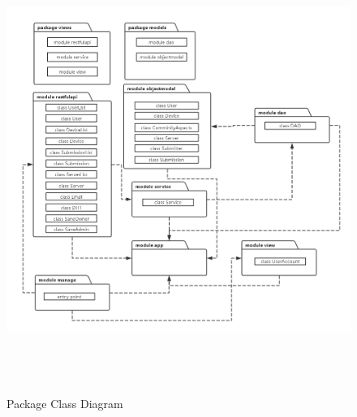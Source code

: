 \documentclass[12pt,oneside,a4paper]{article}
\begin{document}
\begin{figure}[htb]
\centering
\includegraphics[width=450px, height=550px]{classdiagram.png}
\caption{Package Class Diagram}
\label{picture-label14}
\end{figure}\\
\clearpage
\end{document}
